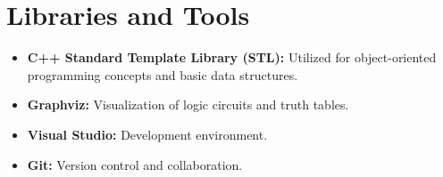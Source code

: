 \section{Libraries and Tools}
\begin{itemize}
    \item \textbf{C++ Standard Template Library (STL):} Utilized for object-oriented programming concepts and basic data structures.
    \item \textbf{Graphviz:} Visualization of logic circuits and truth tables.
    \item \textbf{Visual Studio:} Development environment.
    \item \textbf{Git:} Version control and collaboration.
\end{itemize}